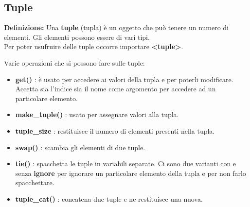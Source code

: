 \subsection{Tuple}

\textsf{\small \textbf{Definizione: } Una \textbf{tuple} (tupla) è un oggetto che può tenere un numero di elementi. Gli elementi possono essere di vari tipi.} \\

\textsf{\small Per poter usufruire delle tuple occorre importare \textbf{<tuple>}.} \break

\textsf{\small Varie operazioni che si possono fare sulle tuple: } \\

\begin{itemize}
	\item \textsf{\small \textbf{get()} : è usato per accedere ai valori della tupla e per poterli modificare. Accetta sia l'indice sia il nome come argomento per accedere ad un particolare elemento.}
	\item \textsf{\small \textbf{make\_tuple()} : usato per assegnare valori alla tupla.}
	\item \textsf{\small \textbf{tuple\_size} : restituisce il numero di elementi presenti nella tupla.}
	\item \textsf{\small \textbf{swap()} : scambia gli elementi di due tuple.}
	\item \textsf{\small \textbf{tie()} : spacchetta le tuple in variabili separate. Ci sono due varianti con e senza \textbf{ignore} per ignorare un particolare elemento della tupla e per non farlo spacchettare.}
	\item \textsf{\small \textbf{tuple\_cat()} : concatena due tuple e ne restituisce una nuova.}
\end{itemize}

